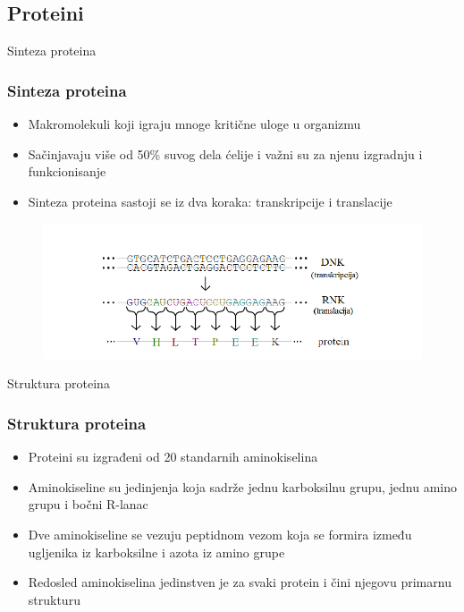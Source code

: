 \documentclass{beamer}
\begin{document}
\subsection{Proteini}
\begin{frame}{Sinteza proteina}
	\frametitle{Sinteza proteina}

	\begin{itemize}
		\item Makromolekuli koji igraju mnoge kritične uloge u organizmu
		
		\item Sačinjavaju više od 50\% suvog dela ćelije i važni su za njenu izgradnju i funkcionisanje
		
		\item Sinteza proteina sastoji se iz dva koraka: transkripcije i translacije
		
	\end{itemize}

	\begin{figure}
		\includegraphics[width=\textwidth]{../Tekst/Figures/protein_synthesis.png}
	\end{figure}

\end{frame}

\begin{frame}{Struktura proteina}
\frametitle{Struktura proteina}

	\begin{itemize}
		\item Proteini su izgrađeni od 20 standarnih aminokiselina
		
		\item Aminokiseline su jedinjenja koja sadrže jednu karboksilnu grupu, jednu amino grupu i bočni R-lanac
		
		\item Dve aminokiseline se vezuju peptidnom vezom koja se formira između ugljenika iz karboksilne i azota iz amino grupe
		
		\item Redosled aminokiselina jedinstven je za svaki protein i čini njegovu primarnu strukturu
	
	\end{itemize}
	
\end{frame}
 
\end{document}
